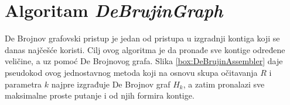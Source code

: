 \documentclass[12pt,oneside]{memoir}
\begin{document}


\begin{comment}
Na slici \ref{fig:5}(c) se može videti primer koji ilustruje izvršavanje algoritma DSK. Neka je $n_{list} = 2$, $n_{sublist} = 2$ and $h(z) = b(z)$ za svaki $z \in Z$. Kako je $n_{list} = 2$, algoritam izvršava 2 iteracije (u nastavku sledi opis nulte iteracije, jer se prva izvršava slično). Prva faza nulte iteracije skenira sve k-mere iz $Z$ i identifikuje svaki k-mer $z \in Z$ koji pripada nultoj listi. Na primer, $h(GG) = 10$, kako je $h(GG)$ \textit{mod} $n_{list} = 0$ i $\frac{h(z)}{n_{list}}$ \textit{mod} $n_{sublist} = 1$, $GG$ pripada nultoj listi i prvoj podlisti. Nakon toga, nulta lista se deli na nultu podlistu $\{CA\}$ i prvu podlistu $\{CG, GG\}$. Obe podliste su zapisane na disku. Druga faza čita svaku podlistu iz memorije i broji k-mere koristeći $JellyFish$ algoritam.
\end{comment}


\section{Algoritam \textit{DeBrujinGraph}}
\label{odeljak:ImplementacijaDB}

De Brojnov grafovski pristup je jedan od pristupa u izgradnji kontiga koji se danas najčešće koristi. Cilj ovog algoritma je da pronađe sve kontige određene veličine, a uz pomoć De Brojnovog grafa. Slika \ref{box:DeBrujinAssembler} daje pseudokod ovog jednostavnog metoda koji na osnovu skupa očitavanja $R$ i parametra $k$ najpre izgrađuje De Brojnov graf $H_k$, a zatim pronalazi sve maksimalne proste putanje i od njih formira kontige.

\begin{comment}

\begin{figure}[!ht]
\centering
\texttt{[image: Figura5\_17.PNG]}
\caption{Jednostavan De Brojnov grafovski asembler \cite{WingKinSung}}
\label{fig:11}
\end{figure}

\end{comment}
\end{document}
